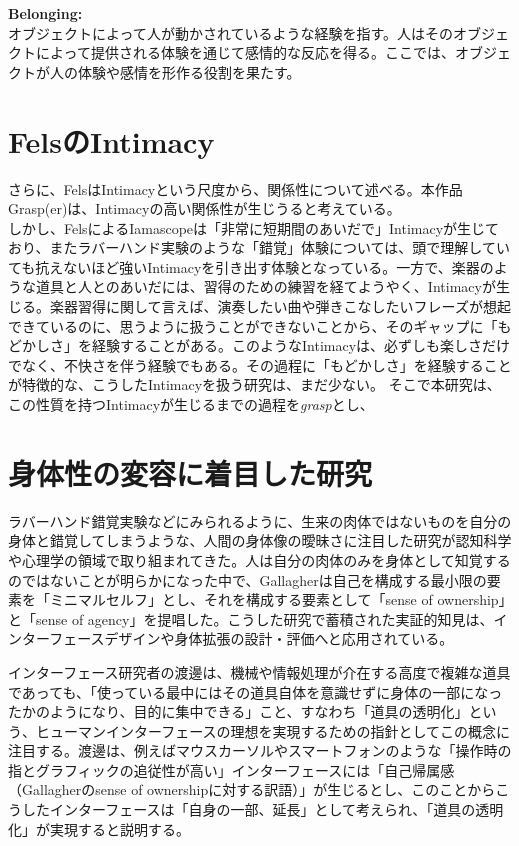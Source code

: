 \textbf{Belonging:}\\
オブジェクトによって人が動かされているような経験を指す。人はそのオブジェクトによって提供される体験を通じて感情的な反応を得る。ここでは、オブジェクトが人の体験や感情を形作る役割を果たす。

\section{FelsのIntimacy}
さらに、FelsはIntimacyという尺度から、関係性について述べる。本作品Grasp(er)は、Intimacyの高い関係性が生じうると考えている。\\
しかし、FelsによるIamascopeは「非常に短期間のあいだで」Intimacyが生じており、またラバーハンド実験のような「錯覚」体験については、頭で理解していても抗えないほど強いIntimacyを引き出す体験となっている。一方で、楽器のような道具と人とのあいだには、習得のための練習を経てようやく、Intimacyが生じる。楽器習得に関して言えば、演奏したい曲や弾きこなしたいフレーズが想起できているのに、思うように扱うことができないことから、そのギャップに「もどかしさ」を経験することがある。このようなIntimacyは、必ずしも楽しさだけでなく、不快さを伴う経験でもある。その過程に「もどかしさ」を経験することが特徴的な、こうしたIntimacyを扱う研究は、まだ少ない。
そこで本研究は、この性質を持つIntimacyが生じるまでの過程を\textit{grasp}とし、

\section{身体性の変容に着目した研究}
ラバーハンド錯覚実験などにみられるように、生来の肉体ではないものを自分の身体と錯覚してしまうような、人間の身体像の曖昧さに注目した研究が認知科学や心理学の領域で取り組まれてきた。人は自分の肉体のみを身体として知覚するのではないことが明らかになった中で、Gallagher\cite{Gallagher2000}は自己を構成する最小限の要素を「ミニマルセルフ」とし、それを構成する要素として「sense of ownership」と「sense of agency」を提唱した。こうした研究で蓄積された実証的知見は、インターフェースデザインや身体拡張の設計・評価へと応用されている。

インターフェース研究者の渡邊は、機械や情報処理が介在する高度で複雑な道具であっても、「使っている最中にはその道具自体を意識せずに身体の一部になったかのようになり、目的に集中できる」こと、すなわち「道具の透明化」という、ヒューマンインターフェースの理想を実現するための指針としてこの概念に注目する。渡邊は、例えばマウスカーソルやスマートフォンのような「操作時の指とグラフィックの追従性が高い」インターフェースには「自己帰属感（Gallagherのsense of ownershipに対する訳語）」が生じるとし、このことからこうしたインターフェースは「自身の一部、延長」として考えられ、「道具の透明化」が実現すると説明する\cite{Watanabe2013}。

